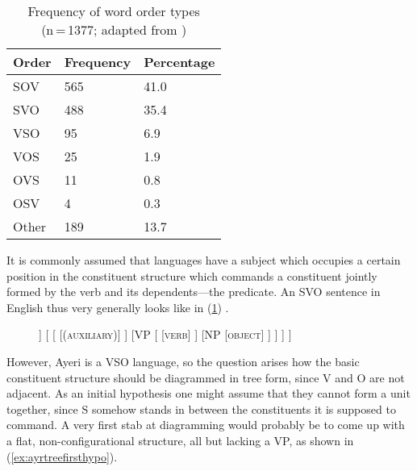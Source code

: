 \begin{table}[t]\centering
\caption[Frequency of word order types]{Frequency of word order types\\
	(n\,=\,1377; adapted from \cite{wals81})}

\begin{tabu} to .5\linewidth {B X[c] X[c]}
\toprule\tableheaderfont
Order
	& Frequency
	& Percentage
	\\

\toprule

SOV
	& 565
	& 41.0\pct
	\\

SVO
	& 488
	& 35.4\pct
	\\

VSO
	& 95
	& 6.9\pct
	\\

\midrule

VOS
	& 25
	& 1.9\pct
	\\

OVS
	& 11
	& 0.8\pct
	\\

OSV
	& 4
	& 0.3\pct
	\\

\midrule

Other
	& 189
	& 13.7\pct
	\\

\bottomrule
\end{tabu}

\label{tab:wordorderfreq}
\end{table}

It is commonly assumed that languages have a subject which occupies a certain
position in the constituent structure which commands a constituent jointly
formed by the verb and its dependents---the predicate. An SVO sentence in
English thus very generally looks like in (\ref{ex:basicsvo})
\parencite[compare the examples in][101--111]{bresnan2016}.

\begin{figure}
\ex\label{ex:basicsvo}
\begin{forest}
[IP
	[NP
		[\textsc{subject}]
	]
	[
		[
			[\textsc{(auxiliary)}]
		]
		[VP
				[
					[\textsc{verb}]
				]
				[NP
					[\textsc{object}]
				]
		]
	]
]
\end{forest}
\xe
\end{figure}

However, Ayeri is a VSO language, so the question arises how the basic
constituent structure should be diagrammed in tree form, since V and O are not
adjacent. As an initial hypothesis one might assume that they cannot form a
unit together, since S somehow stands in between the constituents it is
supposed to command. A very first stab at diagramming would probably be to come
up with a flat, non-configurational structure, all but lacking a VP, as shown
in (\ref{ex:ayrtreefirsthypo}).

